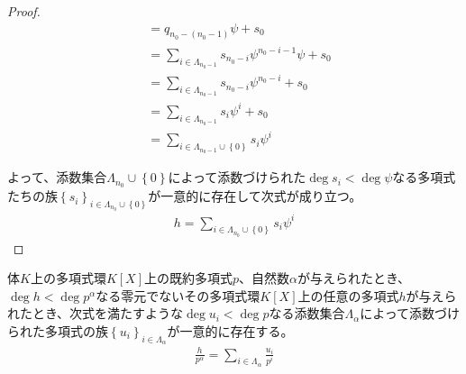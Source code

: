 \documentclass[dvipdfmx]{jsarticle}
\begin{document}
\begin{proof}
\begin{align*}
&= q_{n_{0} - \left( n_{0} - 1 \right)}\psi + s_{0}\\
&= \sum_{i \in \varLambda_{n_{0} - 1}} {s_{n_{0} - i}\psi^{n_{0} - i - 1}}\psi + s_{0}\\
&= \sum_{i \in \varLambda_{n_{0} - 1}} {s_{n_{0} - i}\psi^{n_{0} - i}} + s_{0}\\
&= \sum_{i \in \varLambda_{n_{0} - 1}} {s_{i}\psi^{i}} + s_{0}\\
&= \sum_{i \in \varLambda_{n_{0} - 1} \cup \left\{ 0 \right\}} {s_{i}\psi^{i}}
\end{align*}\par
よって、添数集合$\varLambda_{n_{0}} \cup \left\{ 0 \right\}$によって添数づけられた$\deg s_{i} < \deg\psi$なる多項式たちの族$\left\{ s_{i} \right\}_{i \in \varLambda_{n_{0}} \cup \left\{ 0 \right\}}$が一意的に存在して次式が成り立つ。
\begin{align*}
h = \sum_{i \in \varLambda_{n_{0}} \cup \left\{ 0 \right\}} {s_{i}\psi^{i}}
\end{align*}
\end{proof}
\begin{thm}\label{3.3.4.25}
体$K$上の多項式環$K[ X]$上の既約多項式$p$、自然数$\alpha$が与えられたとき、$\deg h < \deg p^{\alpha}$なる零元でないその多項式環$K[ X]$上の任意の多項式$h$が与えられたとき、次式を満たすような$\deg u_{i} < \deg p$なる添数集合$\varLambda_{\alpha}$によって添数づけられた多項式の族$\left\{ u_{i} \right\}_{i \in \varLambda_{\alpha}}$が一意的に存在する。
\begin{align*}
\frac{h}{p^{\alpha}} = \sum_{i \in \varLambda_{\alpha}} \frac{u_{i}}{p^{i}}
\end{align*}
\end{thm}
\end{document}
